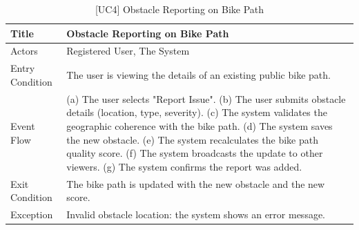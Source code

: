 \begin{table}[H]
    \centering
    \begin{tabular}{|p{4cm}|p{10cm}|}
        \hline
        Title & \textbf{Obstacle Reporting on Bike Path} \\
        \hline
        Actors & Registered User, The System \\
        \hline
        Entry Condition & The user is viewing the details of an existing public bike path. \\
        \hline
        Event Flow & 
        (a) The user selects "Report Issue". \newline
        (b) The user submits obstacle details (location, type, severity). \newline
        (c) The system validates the geographic coherence with the bike path. \newline
        (d) The system saves the new obstacle. \newline
        (e) The system recalculates the bike path quality score. \newline
        (f) The system broadcasts the update to other viewers. \newline
        (g) The system confirms the report was added. \\
        \hline
        Exit Condition & The bike path is updated with the new obstacle and the new score. \\
        \hline
        Exception & 
        Invalid obstacle location: the system shows an error message. \\
        \hline
    \end{tabular}
    \caption{[UC4] Obstacle Reporting on Bike Path}
    \label{tab:uc4}
\end{table}

